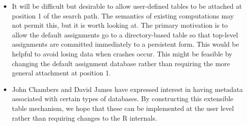 \documentclass{article}
\begin{document}
\begin{itemize}
\item It will be difficult but desirable to allow user-defined tables
to be attached at position 1 of the search path.  The semantics of
existing computations may not permit this, but it is worth looking at.
The primary motivation is to allow the default assignments go to a
directory-based table so that top-level assignments are committed
immediately to a persistent form.  This would be helpful to avoid
losing data when crashes occur.  This might be feasible by changing
the default assignment database rather than requiring the more general
attachment at position 1.

\item John Chambers and David James have expressed interest in having metadata
associated with certain types of databases. By constructing this
extensible table mechanism, we hope that these can be implemented at
the user level rather than requiring changes to the R internals.

\end{itemize}
\end{document}
